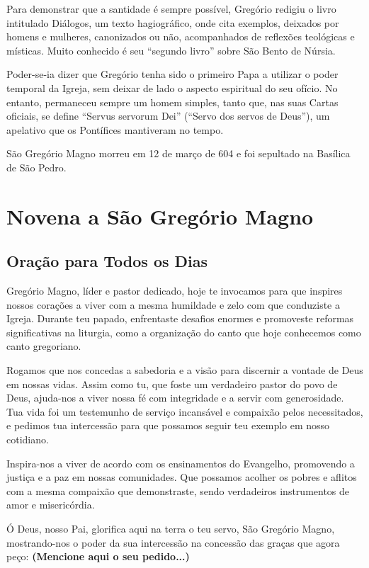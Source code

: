 \documentclass[a4paper,14pt]{extarticle} \usepackage[utf8]{inputenc}
\begin{document}
Para demonstrar que a santidade é sempre possível, Gregório redigiu o livro intitulado Diálogos, um texto hagiográfico, onde cita exemplos, deixados por homens e mulheres, canonizados ou não, acompanhados de reflexões teológicas e místicas. Muito conhecido é seu “segundo livro” sobre São Bento de Núrsia.

Poder-se-ia dizer que Gregório tenha sido o primeiro Papa a utilizar o poder temporal da Igreja, sem deixar de lado o aspecto espiritual do seu ofício. No entanto, permaneceu sempre um homem simples, tanto que, nas suas Cartas oficiais, se define “Servus servorum Dei” (“Servo dos servos de Deus”), um apelativo que os Pontífices mantiveram no tempo.

São Gregório Magno morreu em 12 de março de 604 e foi sepultado na Basílica de São Pedro.


\newpage

\section{Novena a São Gregório Magno}
\subsection{Oração para Todos os Dias} \label{sec:oracao}

Gregório Magno, líder e pastor dedicado, hoje te invocamos para que inspires nossos corações a viver com a mesma humildade e zelo com que conduziste a Igreja. Durante teu papado, enfrentaste desafios enormes e promoveste reformas significativas na liturgia, como a organização do canto que hoje conhecemos como canto gregoriano.

Rogamos que nos concedas a sabedoria e a visão para discernir a vontade de Deus em nossas vidas. Assim como tu, que foste um verdadeiro pastor do povo de Deus, ajuda-nos a viver nossa fé com integridade e a servir com generosidade. Tua vida foi um testemunho de serviço incansável e compaixão pelos necessitados, e pedimos tua intercessão para que possamos seguir teu exemplo em nosso cotidiano.

Inspira-nos a viver de acordo com os ensinamentos do Evangelho, promovendo a justiça e a paz em nossas comunidades. Que possamos acolher os pobres e aflitos com a mesma compaixão que demonstraste, sendo verdadeiros instrumentos de amor e misericórdia.

Ó Deus, nosso Pai, glorifica aqui na terra o teu servo, São Gregório
 Magno, mostrando-nos o poder da sua intercessão na concessão das 
graças que agora peço: \textbf{(Mencione aqui o seu pedido...)}
\end{document}
